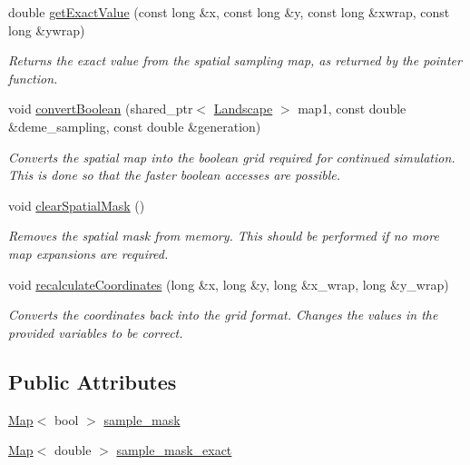 \begin{DoxyCompactItemize}
double \hyperlink{class_data_mask_a2738d996bf7ee99d44a2833b2bed15ef}{get\+Exact\+Value} (const long \&x, const long \&y, const long \&xwrap, const long \&ywrap)
\begin{DoxyCompactList}\small\item\em Returns the exact value from the spatial sampling map, as returned by the pointer function. \end{DoxyCompactList}\item 
void \hyperlink{class_data_mask_a5d0b9245784515c0a2a005c9881551e1}{convert\+Boolean} (shared\+\_\+ptr$<$ \hyperlink{class_landscape}{Landscape} $>$ map1, const double \&deme\+\_\+sampling, const double \&generation)
\begin{DoxyCompactList}\small\item\em Converts the spatial map into the boolean grid required for continued simulation. This is done so that the faster boolean accesses are possible. \end{DoxyCompactList}\item 
void \hyperlink{class_data_mask_a2d152bcb13820a9061ea85c984e042a7}{clear\+Spatial\+Mask} ()\hypertarget{class_data_mask_a2d152bcb13820a9061ea85c984e042a7}{}\label{class_data_mask_a2d152bcb13820a9061ea85c984e042a7}

\begin{DoxyCompactList}\small\item\em Removes the spatial mask from memory. This should be performed if no more map expansions are required. \end{DoxyCompactList}\item 
void \hyperlink{class_data_mask_a5eaef817c1baf4ac14d06d0e92bd4787}{recalculate\+Coordinates} (long \&x, long \&y, long \&x\+\_\+wrap, long \&y\+\_\+wrap)
\begin{DoxyCompactList}\small\item\em Converts the coordinates back into the grid format. Changes the values in the provided variables to be correct. \end{DoxyCompactList}\end{DoxyCompactItemize}
\subsection*{Public Attributes}
\begin{DoxyCompactItemize}
\item 
\hyperlink{class_map}{Map}$<$ bool $>$ \hyperlink{class_data_mask_a0ebe741d4b22824f93dacddd175d2c96}{sample\+\_\+mask}
\item 
\hyperlink{class_map}{Map}$<$ double $>$ \hyperlink{class_data_mask_acc231ebddc3e5db0103220b20d968a4f}{sample\+\_\+mask\+\_\+exact}
\end{DoxyCompactItemize}
